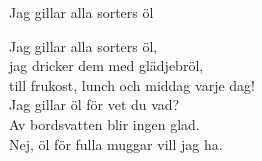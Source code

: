 \begin{song}{Jag gillar alla sorters öl}
	
	
		
	Jag gillar alla sorters öl,\\
	jag dricker dem med glädjebröl,\\
	till frukost, lunch och middag varje dag!\\
	Jag gillar öl för vet du vad?\\
	Av bordsvatten blir ingen glad.\\
	Nej, öl för fulla muggar vill jag ha.

	
\end{song}
